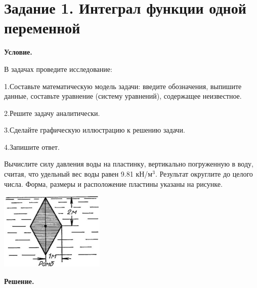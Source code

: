 \section{Задание 1. Интеграл функции одной переменной}

\textbf{Условие.}

В задачах проведите исследование:

1.Составьте математическую модель задачи: введите обозначения, выпишите данные,  составьте уравнение (систему уравнений), содержащее неизвестное.

2.Решите задачу аналитически.

3.Сделайте графическую иллюстрацию к решению задачи.

4.Запишите ответ.

\vspace{5mm}

\begin{multicols}{2}
    Вычислите силу давления воды на пластинку,
    вертикально погруженную в воду,
    считая, что удельный вес воды равен 9.81 кН/м$^3$.
    Результат округлите до целого числа.
    Форма, размеры и расположение пластины указаны на рисунке.

    \includegraphics[width=5cm]{images/1a1}

\end{multicols}

\vspace{10mm}

\textbf{Решение.}

\vspace{5mm}

